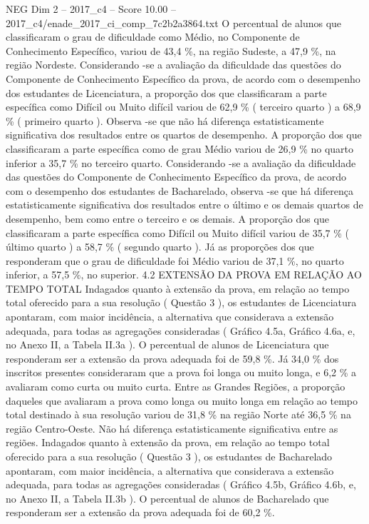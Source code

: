 \begin{textsample}{NEG Dim 2 – 2017\_c4 – Score 10.00 – 2017\_c4/enade\_2017\_ci\_comp\_7c2b2a3864.txt}
O percentual de alunos que classificaram o grau de dificuldade como Médio, no Componente de Conhecimento Específico, variou de 43,4 \%, na região Sudeste, a 47,9 \%, na região Nordeste.
Considerando -se a avaliação da dificuldade das questões do Componente de Conhecimento Específico da prova, de acordo com o desempenho dos estudantes de Licenciatura, a proporção dos que classificaram a parte específica como Difícil ou Muito difícil variou de 62,9 \% ( terceiro quarto ) a 68,9 \% ( primeiro quarto ).
Observa -se que não há diferença estatisticamente significativa dos resultados entre os quartos de desempenho.
A proporção dos que classificaram a parte específica como de grau Médio variou de 26,9 \% no quarto inferior a 35,7 \% no terceiro quarto.
Considerando -se a avaliação da dificuldade das questões do Componente de Conhecimento Específico da prova, de acordo com o desempenho dos estudantes de Bacharelado, observa -se que há diferença estatisticamente significativa dos resultados entre o último e os demais quartos de desempenho, bem como entre o terceiro e os demais.
A proporção dos que classificaram a parte específica como Difícil ou Muito difícil variou de 35,7 \% ( último quarto ) a 58,7 \% ( segundo quarto ).
Já as proporções dos que responderam que o grau de dificuldade foi Médio variou de 37,1 \%, no quarto inferior, a 57,5 \%, no superior. 4.2 EXTENSÃO DA PROVA EM RELAÇÃO AO TEMPO TOTAL Indagados quanto à extensão da prova, em relação ao tempo total oferecido para a sua resolução ( Questão 3 ), os estudantes de Licenciatura apontaram, com maior incidência, a alternativa que considerava a extensão adequada, para todas as agregações consideradas ( Gráfico 4.5a, Gráfico 4.6a, e, no Anexo II, a Tabela II.3a ).
O percentual de alunos de Licenciatura que responderam ser a extensão da prova adequada foi de 59,8 \%.
Já 34,0 \% dos inscritos presentes consideraram que a prova foi longa ou muito longa, e 6,2 \% a avaliaram como curta ou muito curta.
Entre as Grandes Regiões, a proporção daqueles que avaliaram a prova como longa ou muito longa em relação ao tempo total destinado à sua resolução variou de 31,8 \% na região Norte até 36,5 \% na região Centro-Oeste.
Não há diferença estatisticamente significativa entre as regiões.
Indagados quanto à extensão da prova, em relação ao tempo total oferecido para a sua resolução ( Questão 3 ), os estudantes de Bacharelado apontaram, com maior incidência, a alternativa que considerava a extensão adequada, para todas as agregações consideradas ( Gráfico 4.5b, Gráfico 4.6b, e, no Anexo II, a Tabela II.3b ).
O percentual de alunos de Bacharelado que responderam ser a extensão da prova adequada foi de 60,2 \%.

\end{textsample}
